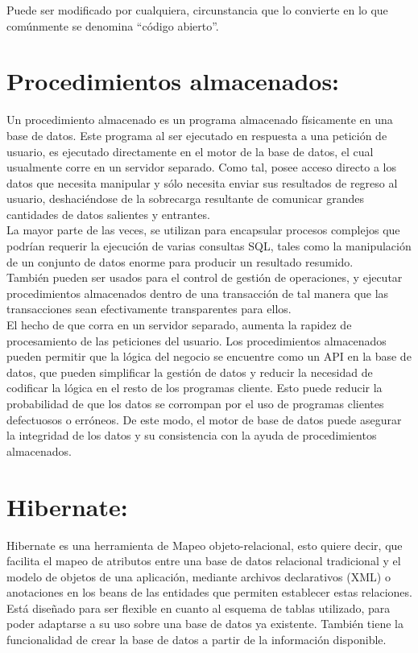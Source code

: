 \documentclass[12pt,oneside]{book}
\begin{document}
	Puede ser modificado por cualquiera, circunstancia que lo convierte en lo que comúnmente se denomina “código abierto”.
	
	\section{Procedimientos almacenados:}
	
	Un procedimiento almacenado es un programa almacenado físicamente en una base de datos.
	Este programa al ser ejecutado en respuesta a una petición de usuario, es ejecutado directamente en el motor de la base de datos, el cual usualmente corre en un servidor separado. Como tal, posee acceso directo a los datos que necesita manipular y sólo necesita enviar sus resultados de regreso al usuario, deshaciéndose de la sobrecarga resultante de comunicar grandes cantidades de datos salientes y entrantes. \\
	
	La mayor parte de las veces, se utilizan para encapsular procesos complejos que podrían requerir  la ejecución de varias consultas SQL, tales como la manipulación de un conjunto de datos enorme para producir un resultado resumido. \\
	
	También pueden ser usados para el control de gestión de operaciones, y ejecutar procedimientos almacenados dentro de una transacción de tal manera que las transacciones sean efectivamente transparentes para ellos. \\
	
El hecho de que corra en un servidor separado, aumenta la rapidez de procesamiento de las peticiones del usuario. Los procedimientos almacenados pueden permitir que la lógica del negocio se encuentre como un API en la base de datos, que pueden simplificar la gestión de datos y reducir la necesidad de codificar la lógica en el resto de los programas cliente. Esto puede reducir la probabilidad de que los datos se corrompan por el uso de programas clientes defectuosos o erróneos. De este modo, el motor de base de datos puede asegurar la integridad de los datos y su consistencia con la ayuda de procedimientos almacenados.

	
	
	\section{Hibernate:}
	
	Hibernate es una herramienta de Mapeo objeto-relacional, esto quiere decir, que facilita el mapeo de atributos entre una base de datos relacional tradicional y el modelo de objetos de una aplicación, mediante archivos declarativos (XML) o anotaciones en los beans de las entidades que permiten establecer estas relaciones. \\
	Está diseñado para ser flexible en cuanto al esquema de tablas utilizado, para poder adaptarse a su uso sobre una base de datos ya existente. También tiene la funcionalidad de crear la base de datos a partir de la información disponible. \\
	
\end{document}

